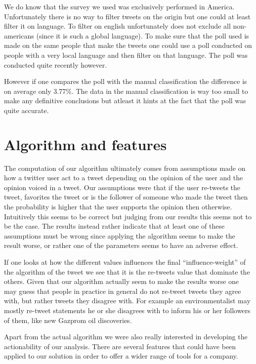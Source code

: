 \documentclass[a4paper,12pt]{report}
\begin{document}
We do know that the survey we used was exclusively performed in America. Unfortunately there is no way to filter tweets on the origin but one could at least filter it on language. To filter on english unfortunately does not exclude all non-americans (since it is such a global language). To make sure that the poll used is made on the same people that make the tweets one could use a poll conducted on people with a very local language and then filter on that language. The poll was conducted quite recently however.

However if one compares the poll with the manual classification the difference is on average only 3.77\%. The data in the manual classification is way too small to make any definitive conclusions but atleast it hints at the fact that the poll was quite accurate.

\section{Algorithm and features}

The computation of our algorithm ultimately comes from assumptions made on how a twitter user act to a tweet depending on the opinion of the user and the opinion voiced in a tweet. Our assumptions were that if the user re-tweets the tweet, favorites the tweet or is the follower of someone who made the tweet then the probability is higher that the user supports the opinion then otherwise. Intuitively this seems to be correct but judging from our results this seems not to be the case. The results instead rather indicate that at least one of these assumptions must be wrong since applying the algorithm seems to make the result worse, or rather one of the parameters seems to have an adverse effect. 

If one looks at how the different values influences the final ``influence-weight'' of the algorithm of the tweet we see that it is the re-tweets value that dominate the others. Given that our algorithm actually seem to make the results worse one may guess that people in practice in general do not re-tweet tweets they agree with, but rather tweets they disagree with. For example an environmentalist may mostly re-tweet statements he or she disagrees with to inform his or her followers of them, like new Gazprom oil discoveries.

Apart from the actual algorithm we were also really interested in developing the actionability of our analysis. There are several features that could have been applied to our solution in order to offer a wider range of tools for a company.
\end{document}
